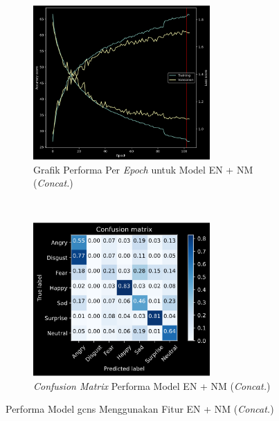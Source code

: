 \begin{figure}[t]
    \centering
    \begin{subfigure}[t]{6.75cm}
        \includegraphics[width=6.75cm]{gambar/eksperimen4b6_grafik1.png}
        \caption{Grafik Performa Per \textit{Epoch} untuk Model EN + NM (\textit{Concat.})}
        \label{fig:confusionmatrixeksperimen4b6}
    \end{subfigure}
    ~~~
    \begin{subfigure}[t]{6.75cm}
        \includegraphics[width=6.75cm]{gambar/eksperimen4b6_matriks1.png}
        \caption{\textit{Confusion Matrix} Performa Model EN + NM (\textit{Concat.})}
        \label{fig:confusionmatrixeksperimen4b6}
    \end{subfigure}
    \caption{Performa Model \acrshort{gcns} Menggunakan Fitur EN + NM (\textit{Concat.})}
    \label{fig:hasileksperimen4b6}
\end{figure}


